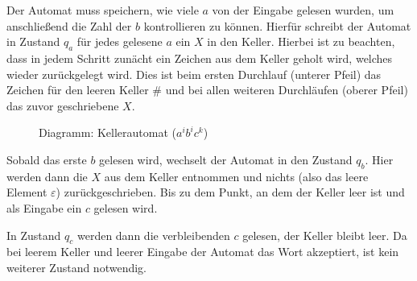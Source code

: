 Der Automat muss speichern, wie viele $a$ von der Eingabe gelesen wurden, um anschließend die Zahl der $b$ 
kontrollieren zu können. Hierfür schreibt der Automat in Zustand $q_a$ für jedes gelesene $a$ ein $X$ in den Keller. Hierbei ist zu 
beachten, dass in jedem Schritt zunächt ein Zeichen aus dem Keller geholt wird, welches wieder zurückgelegt wird.
Dies ist beim ersten Durchlauf (unterer Pfeil) das Zeichen für den leeren Keller $\#$ 
und bei allen weiteren Durchläufen (oberer Pfeil) das zuvor geschriebene $X$.

\begin{figure}[H]
\centering
{}
\caption{Diagramm: Kellerautomat ($a^ib^ic^k$)}
\label{fig:aibick}
\end{figure}

Sobald das erste $b$ gelesen wird, wechselt der Automat in den Zustand $q_b$. Hier werden dann die $X$ aus dem Keller entnommen
und nichts (also das leere Element $\varepsilon$) zurückgeschrieben. Bis zu dem Punkt, an dem der Keller leer ist und als Eingabe ein $c$
gelesen wird.

In Zustand $q_c$ werden dann die verbleibenden $c$ gelesen, der Keller bleibt leer. Da bei leerem Keller und leerer Eingabe
der Automat das Wort akzeptiert, ist kein weiterer Zustand notwendig.

